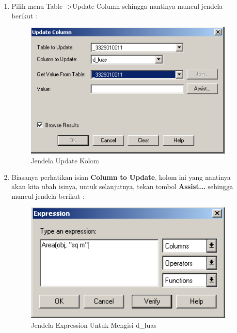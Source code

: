 \begin{enumerate}[1.]
  \item Pilih menu Table -\textgreater Update Column sehingga nantinya muncul jendela berikut :
  
  \begin{figure}[H]
    \centering
    \includegraphics[width=1\textwidth]{./resources/067-jendela-update-column}
    \caption{Jendela Update Kolom}
  \end{figure}
  
  \item Biasanya perhatikan isian \textbf{Column to Update}, kolom ini yang nantinya akan kita ubah isinya, untuk selanjutnya, tekan tombol \textbf{Assist...} sehingga muncul jendela berikut :
  
  \begin{figure}[H]
    \centering
    \includegraphics[width=1\textwidth]{./resources/068-jendela-expression-untuk-d_luas}
    \caption{Jendela Expression Untuk Mengisi d\_luas}
  \end{figure}
  

\end{enumerate}
